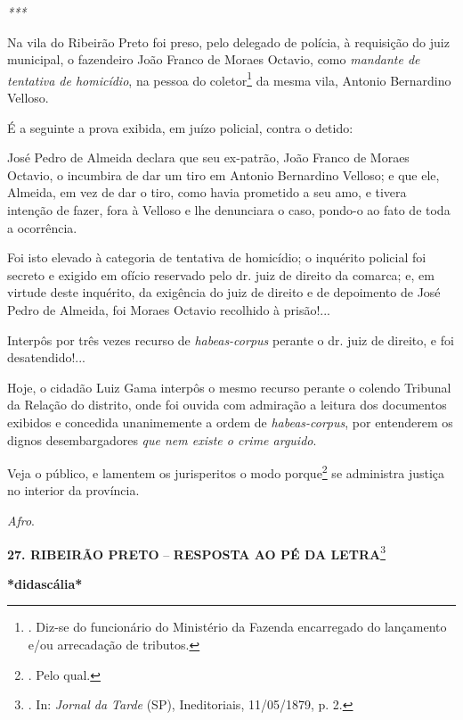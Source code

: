 \emph{***}

Na vila do Ribeirão Preto foi preso, pelo delegado de polícia, à
requisição do juiz municipal, o fazendeiro João Franco de Moraes
Octavio, como \emph{mandante de tentativa de homicídio}, na pessoa do
coletor\footnote{. Diz-se do funcionário do Ministério da Fazenda
  encarregado do lançamento e/ou arrecadação de tributos.} da mesma
vila, Antonio Bernardino Velloso.

É a seguinte a prova exibida, em juízo policial, contra o detido:

José Pedro de Almeida declara que seu ex-patrão, João Franco de Moraes
Octavio, o incumbira de dar um tiro em Antonio Bernardino Velloso; e que
ele, Almeida, em vez de dar o tiro, como havia prometido a seu amo, e
tivera intenção de fazer, fora à Velloso e lhe denunciara o caso,
pondo-o ao fato de toda a ocorrência.

Foi isto elevado à categoria de tentativa de homicídio; o inquérito
policial foi secreto e exigido em ofício reservado pelo dr. juiz de
direito da comarca; e, em virtude deste inquérito, da exigência do juiz
de direito e de depoimento de José Pedro de Almeida, foi Moraes Octavio
recolhido à prisão!...

Interpôs por três vezes recurso de \emph{habeas-corpus} perante o dr.
juiz de direito, e foi desatendido!...

Hoje, o cidadão Luiz Gama interpôs o mesmo recurso perante o colendo
Tribunal da Relação do distrito, onde foi ouvida com admiração a leitura
dos documentos exibidos e concedida unanimemente a ordem de
\emph{habeas-corpus}, por entenderem os dignos desembargadores \emph{que
nem existe o crime arguido}.

Veja o público, e lamentem os jurisperitos o modo porque\footnote{. Pelo
  qual.} s\protect\hypertarget{Secao_Sem_Titulo-35}{}{}e administra
justiça no interior da província.

\emph{Afro}.

\textbf{27. RIBEIRÃO PRETO} -- \textbf{RESPOSTA AO PÉ DA
LETRA}\footnote{. In: \emph{Jornal da Tarde} (SP), Ineditoriais,
  11/05/1879, p. 2.}

\textbf{*didascália*}

